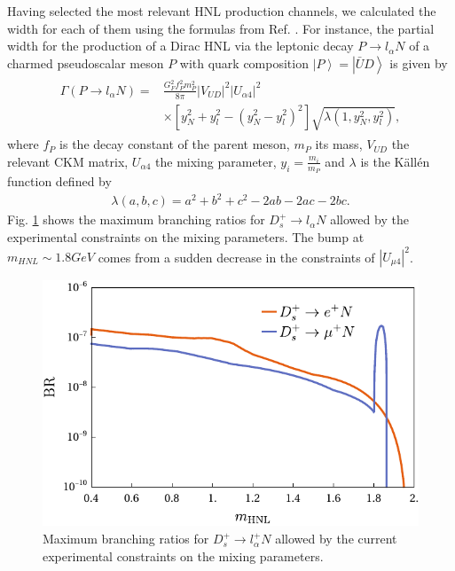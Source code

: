 \documentclass[aps,prd,twocolumn,superscriptaddress,amsmath,amssymb]{revtex4}
\newcommand{\lw}{\linewidth}
\begin{document}
Having selected the most relevant HNL production channels, we calculated the width for each of them using the formulas from Ref. \cite{bondarenko2018}. For instance, the partial width for the production of a Dirac HNL via the leptonic decay $P\to l_\alpha N$ of a charmed pseudoscalar meson $P$ with quark composition $\left|P\right>=\left|\bar{U}D\right>$ is given by
\begin{align}
\begin{split}
\Gamma(P\to l_\alpha N)=&\frac{G_F^2f_P^2m_P^2}{8\pi}|V_{UD}|^2|U_{\alpha4}|^2\\
&\times \left[y_N^2+y_l^2-(y_N^2-y_l^2)^2 \right]\sqrt{\lambda(1,y_N^2,y_l^2)},
\end{split}
\label{eq:widthleptonic}
\end{align}
where $f_P$ is the decay constant of the parent meson, $m_P$ its mass, $V_{UD}$ the relevant CKM matrix, $U_{\alpha4}$ the mixing parameter, $y_i=\frac{m_i}{m_P}$ and $\lambda$ is the K\"all\'en function \cite{kallen1965elementary} defined by
\begin{align}
\lambda(a,b,c)=a^2+b^2+c^2-2ab-2ac-2bc.
\end{align}
Fig. \ref{fig:br431} shows the maximum branching ratios for $D_s^+\to l_\alpha N$ allowed by the experimental constraints on the mixing parameters. The bump at $m_{HNL}\sim 1.8GeV$ comes from a sudden decrease in the constraints of $|U_{\mu4}|^2$.\\

\begin{figure}[h]
\centering
\includegraphics[width=.9\lw]{plots/br431.pdf}
\caption{Maximum branching ratios for $D_s^+\to l_\alpha^+ N$ allowed by the current experimental constraints on the mixing parameters.}
\label{fig:br431}
\end{figure}
\end{document}
